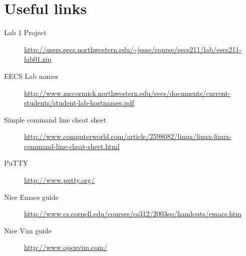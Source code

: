 \documentclass{tufte-handout}
\begin{document}
\section{Useful links}

\begin{description}

  \item[Lab 1 Project]
\url{http://users.eecs.northwestern.edu/~jesse/course/eecs211/lab/eecs211-lab01.zip}

\item[EECS Lab names]
\url{http://www.mccormick.northwestern.edu/eecs/documents/current-students/student-lab-hostnames.pdf}

\item[Simple command line cheat sheet]
\url{http://www.computerworld.com/article/2598082/linux/linux-linux-command-line-cheat-sheet.html}

\item[PuTTY]
\url{http://www.putty.org/}

\item[Nice Emacs guide]
\url{http://www.cs.cornell.edu/courses/cs312/2003sp/handouts/emacs.htm}

\item[Nice Vim guide]
\url{http://www.openvim.com/}

\end{description}
\end{document}
